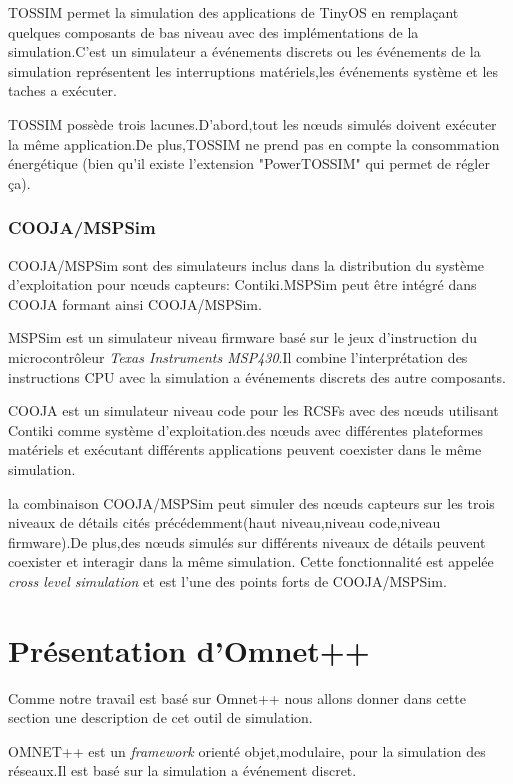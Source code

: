 TOSSIM permet la simulation des applications de TinyOS en remplaçant quelques composants de bas niveau avec des implémentations de la simulation.C'est un simulateur a événements discrets ou les événements de la simulation représentent les interruptions matériels,les événements système et les taches a exécuter.

TOSSIM possède trois lacunes.D'abord,tout les nœuds simulés doivent exécuter la même application.De plus,TOSSIM ne prend pas en compte la consommation énergétique (bien qu'il existe l'extension "PowerTOSSIM" qui permet de régler ça).

\subsubsection{COOJA/MSPSim}
COOJA/MSPSim sont des simulateurs inclus dans la distribution du système d'exploitation pour nœuds capteurs: Contiki.MSPSim peut être intégré dans COOJA formant ainsi COOJA/MSPSim.

MSPSim est un simulateur niveau firmware basé sur le jeux d'instruction du microcontrôleur \emph{Texas Instruments MSP430}.Il combine l'interprétation des instructions CPU avec la simulation a événements discrets des autre composants.

COOJA est un simulateur niveau code pour les RCSFs avec des nœuds utilisant Contiki comme système d'exploitation.des nœuds avec différentes  plateformes matériels et exécutant différents applications peuvent coexister dans le même simulation.

la combinaison COOJA/MSPSim peut simuler des nœuds capteurs sur les trois niveaux de détails cités précédemment(haut niveau,niveau code,niveau firmware).De plus,des nœuds simulés sur différents niveaux de détails peuvent coexister et interagir dans la même simulation. 
Cette fonctionnalité est appelée \emph{cross level simulation} et est l'une des points forts de COOJA/MSPSim.

\section{Présentation d'Omnet++}
Comme notre travail est basé sur Omnet++ nous allons donner dans cette section une description de cet outil de simulation.

OMNET++ est un \emph{framework} orienté objet,modulaire, pour la simulation des réseaux.Il est basé sur la simulation a événement discret.

